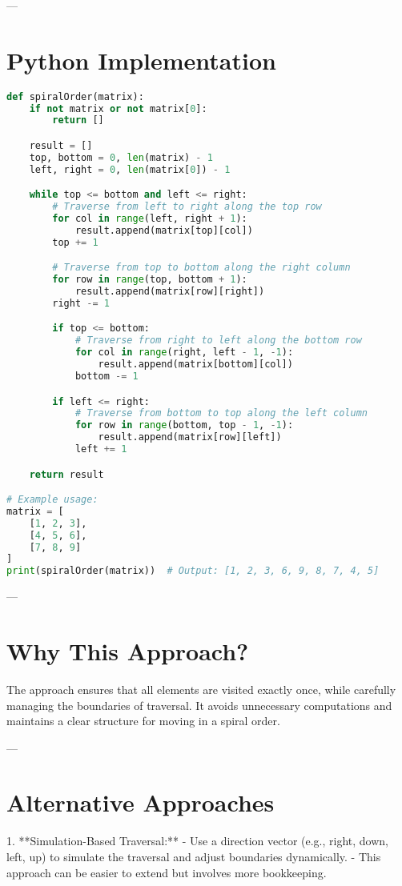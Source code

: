 ---

\section*{Python Implementation}
\begin{fullwidth}
\begin{lstlisting}[language=Python]
def spiralOrder(matrix):
    if not matrix or not matrix[0]:
        return []

    result = []
    top, bottom = 0, len(matrix) - 1
    left, right = 0, len(matrix[0]) - 1

    while top <= bottom and left <= right:
        # Traverse from left to right along the top row
        for col in range(left, right + 1):
            result.append(matrix[top][col])
        top += 1

        # Traverse from top to bottom along the right column
        for row in range(top, bottom + 1):
            result.append(matrix[row][right])
        right -= 1

        if top <= bottom:
            # Traverse from right to left along the bottom row
            for col in range(right, left - 1, -1):
                result.append(matrix[bottom][col])
            bottom -= 1

        if left <= right:
            # Traverse from bottom to top along the left column
            for row in range(bottom, top - 1, -1):
                result.append(matrix[row][left])
            left += 1

    return result

# Example usage:
matrix = [
    [1, 2, 3],
    [4, 5, 6],
    [7, 8, 9]
]
print(spiralOrder(matrix))  # Output: [1, 2, 3, 6, 9, 8, 7, 4, 5]
\end{lstlisting}
\end{fullwidth}

---

\section*{Why This Approach?}
The approach ensures that all elements are visited exactly once, while carefully managing the boundaries of traversal. It avoids unnecessary computations and maintains a clear structure for moving in a spiral order.

---

\section*{Alternative Approaches}
1. **Simulation-Based Traversal:**
   - Use a direction vector (e.g., right, down, left, up) to simulate the traversal and adjust boundaries dynamically.
   - This approach can be easier to extend but involves more bookkeeping.


